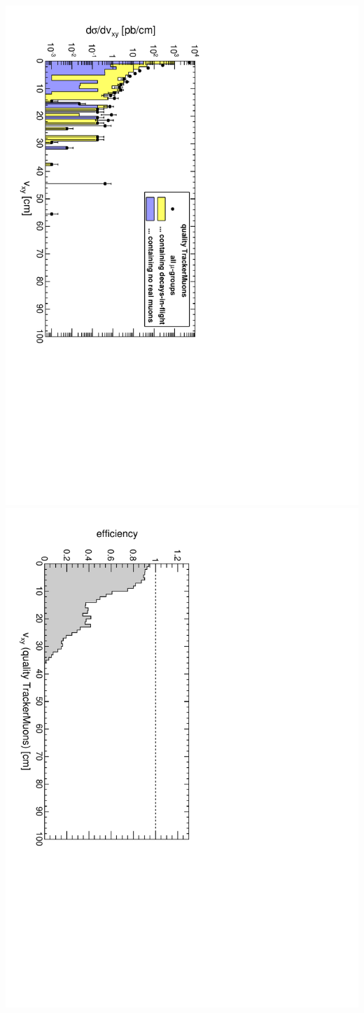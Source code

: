 \documentclass[compress]{beamer}
\begin{document}
\begin{frame}
\begin{center}
{\includegraphics[height=0.45\linewidth, angle=90]{dispvert_QualityTrackerMuonAny.pdf}
\includegraphics[height=0.45\linewidth, angle=90]{dispvert_eff_QualityTrackerMuonAny.pdf}}
\end{center}
\end{frame}
\end{document}
